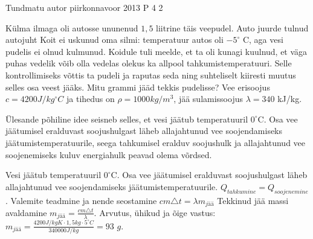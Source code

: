 {Tundmatu autor} %
{piirkonnavoor} %
{2013} %
{P 4} %
{2} %
{

\ifStatement
Külma ilmaga oli autosse ununenud $1,5$ liitrine täis veepudel. Auto juurde tulnud autojuht Koit ei uskunud oma silmi: temperatuur autos oli $-5 ^{\circ}$ C, aga vesi pudelis ei olnud kulmunud. Koidule tuli meelde, et ta oli kunagi kuulnud, et väga puhas vedelik võib olla vedelas olekus ka allpool tahkumistemperatuuri. Selle kontrollimiseks võttis ta pudeli ja raputas seda ning suhteliselt kiiresti muutus selles osa veest jääks. Mitu grammi jääd tekkis pudelisse? Vee erisoojus $c = 4200 J/kg^{\circ}C$ ja tihedus on $\rho = 1000 kg/m^3$, jää sulamissoojus $\lambda = 340$ kJ/kg.
\fi

\ifHint
Ülesande põhiline idee seisneb selles, et vesi jäätub temperatuuril $0 ^{\circ}$C. Osa vee jäätumisel eralduvast soojushulgast läheb allajahtunud vee soojendamiseks jäätumistemperatuurile, seega tahkumisel eralduv soojushulk ja allajahtunud vee soojenemiseks kuluv energiahulk peavad olema võrdsed.
\fi

\ifSolution
Vesi jäätub temperatuuril $0 ^{\circ}$C. Osa vee jäätumisel eralduvast soojushulgast läheb allajahtunud vee soojendamiseks jäätumistemperatuurile.
\newline
$Q_{tahkumine} = Q_{soojenemine} $.
\newline
Valemite teadmine ja nende seostamine $cm\triangle t = \lambda m_{jää}$
\newline
Tekkinud jää massi avaldamine $m_{jää} =  \frac{cm \triangle t}{\lambda}$.
\newline
Arvutus, ühikud ja õige vastus:
\newline
$m_{jää} = \frac{4200 J/kgK \cdot 1,5 kg \cdot 5 ^{\circ}C}{340 000 J/kg} = 93$ $g$.
\fi
}